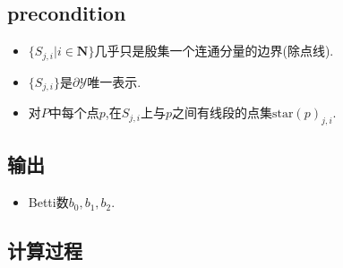 \documentclass[a4paper]{book}
\numberwithin{equation}{chapter}
\theoremstyle{definition}
\begin{document}
\subsection{precondition}

\begin{itemize}
    \item $\{{S_{j,i}} | i \in  \mathbf{N}\}$几乎只是殷集一个连通分量的边界(除点线).
    \item $\{{S_{j,i}} \}$是$\partial \mathcal{Y}$唯一表示.
    \item 对$P$中每个点$p$,在$S_{j,i}$上与$p$之间有线段的点集$\text{star}(p)_{j,i}$.
\end{itemize}

\subsection{输出}

\begin{itemize}
    \item Betti数$b_0, b_1, b_2$.
\end{itemize}

\subsection{计算过程}
\end{document}
